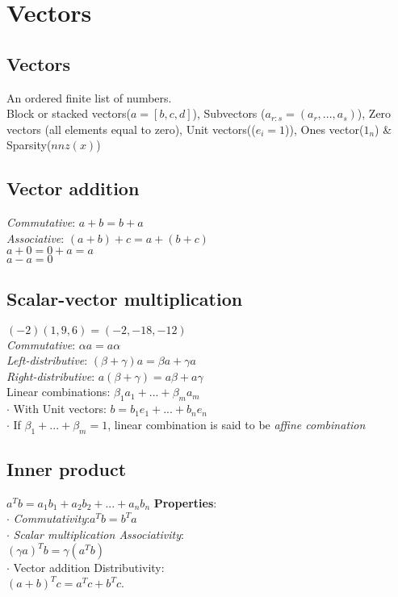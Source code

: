 \section{Vectors}
\subsection*{Vectors}
An ordered finite list of numbers.\\
Block or stacked vectors($a = [b, c, d]$), Subvectors ($a_{r:s} = (a_r,...,a_s)$), Zero vectors (all elements equal to zero), Unit vectors(($e_i = 1$)), Ones vector($1_n$) \& Sparsity($nnz(x)$)

\subsection*{Vector addition}
\textit{Commutative}: $a + b = b + a$\\
\textit{Associative}: $(a + b) + c = a + (b + c)$\\
$a+0 = 0+a = a$\\
$a - a = 0$

\subsection{Scalar-vector multiplication}
$(-2)(1, 9, 6)=(-2, -18, -12)$\\
\textit{Commutative}: $\alpha a = a \alpha$\\
\textit{Left-distributive}: $(\beta + \gamma)a = \beta a + \gamma a$\\
\textit{Right-distributive}: $a(\beta + \gamma) = a\beta + a\gamma $ \\

Linear combinations: $\beta_1 a_1 + ... + \beta_m a_m$\\
$\cdot$ With Unit vectors: $b = b_1 e_1 +...+ b_n e_n$ \\
$\cdot$ If $\beta_1 +...+ \beta_m = 1$, linear combination is said to be \textit{affine combination}

\subsection{Inner product}
$a^T b = a_1 b_1 +a_2 b_2 +...+ a_n b_n$
\textbf{Properties}:\\
$\cdot$ \textit{Commutativity}:$a^T b = b^T a$\\
$\cdot$ \textit{Scalar multiplication Associativity}:\\ $(\gamma a)^T b = \gamma(a^T b)$\\
$\cdot$ {Vector addition Distributivity}:\\
$(a + b)^T c = a^T c + b^T c.$


